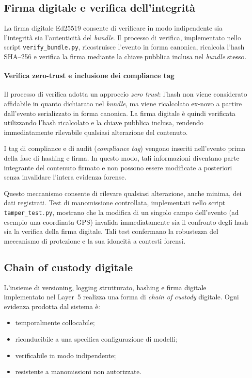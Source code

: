 \subsection{Firma digitale e verifica dell’integrità}

La firma digitale Ed25519 consente di verificare in modo indipendente sia l’integrità sia l’autenticità del \textit{bundle}.
Il processo di verifica, implementato nello script \texttt{verify\_bundle.py}, ricostruisce l’evento in forma canonica, ricalcola l’hash SHA--256 e verifica la firma mediante la chiave pubblica inclusa nel \textit{bundle} stesso.

\paragraph{Verifica zero-trust e inclusione dei compliance tag}

Il processo di verifica adotta un approccio \emph{zero trust}: l’hash non viene considerato affidabile in quanto dichiarato nel \textit{bundle}, ma viene ricalcolato ex-novo a partire dall’evento serializzato in forma canonica.
La firma digitale è quindi verificata utilizzando l’hash ricalcolato e la chiave pubblica inclusa, rendendo immediatamente rilevabile qualsiasi alterazione del contenuto.

I tag di compliance e di audit (\textit{compliance tag}) vengono inseriti nell’evento prima della fase di hashing e firma.
In questo modo, tali informazioni diventano parte integrante del contenuto firmato e non possono essere modificate a posteriori senza invalidare l’intera evidenza forense.

Questo meccanismo consente di rilevare qualsiasi alterazione, anche minima, dei dati registrati.
Test di manomissione controllata, implementati nello script \texttt{tamper\_test.py}, mostrano che la modifica di un singolo campo dell’evento (ad esempio una coordinata GPS) invalida immediatamente sia il confronto degli hash sia la verifica della firma digitale.
Tali test confermano la robustezza del meccanismo di protezione e la sua idoneità a contesti forensi.

\subsection{Chain of custody digitale}

L’insieme di versioning, logging strutturato, hashing e firma digitale implementato nel Layer~5 realizza una forma di \emph{chain of custody} digitale.
Ogni evidenza prodotta dal sistema è:
\begin{itemize}
	\item temporalmente collocabile;
	\item riconducibile a una specifica configurazione di modelli;
	\item verificabile in modo indipendente;
	\item resistente a manomissioni non autorizzate.
\end{itemize}

